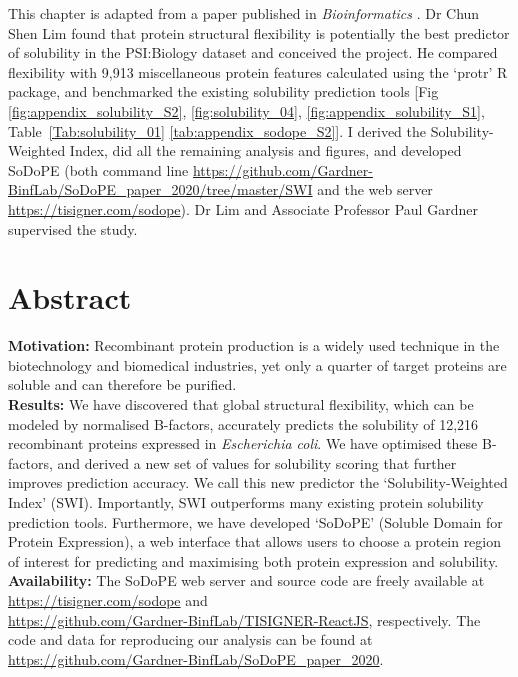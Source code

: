 This chapter is adapted from a paper published in \textit{Bioinformatics} \cite{Bhandari2020-pz}. Dr Chun Shen Lim found that protein structural flexibility is potentially the best predictor of solubility in the PSI:Biology dataset and conceived the project. He compared flexibility with 9,913 miscellaneous protein features calculated using the ‘protr’ R package, and benchmarked the existing solubility prediction tools [Fig \ref{fig:appendix_solubility_S2}, \ref{fig:solubility_04},  \ref{fig:appendix_solubility_S1}, Table~\ref{Tab:solubility_01} \ref{tab:appendix_sodope_S2}]. I derived the Solubility-Weighted Index,  did all the remaining analysis and figures, and developed SoDoPE (both command line \href{https://github.com/Gardner-BinfLab/SoDoPE\_paper\_2020/tree/master/SWI}{https://github.com/Gardner-BinfLab/SoDoPE\_paper\_2020/tree/master/SWI} and the web server \href{https://tisigner.com/sodope}{https://tisigner.com/sodope}). Dr Lim and Associate Professor Paul Gardner supervised the study.


\section{Abstract}
\textbf{Motivation:} Recombinant protein production is a widely used technique in the biotechnology and biomedical industries, yet only a quarter of target proteins are soluble and can therefore be purified.\\
\textbf{Results:} We have discovered that global structural flexibility, which can be modeled by normalised B-factors, accurately predicts the solubility of 12,216 recombinant proteins expressed in \textit{Escherichia coli}. We have optimised these B-factors, and derived a new set of values for solubility scoring that further improves prediction accuracy. We call this new predictor the ‘Solubility-Weighted Index’ (SWI). Importantly, SWI outperforms many existing protein solubility prediction tools. Furthermore, we have developed ‘SoDoPE’ (Soluble Domain for Protein Expression), a web interface that allows users to choose a protein region of interest for predicting and maximising both protein expression and solubility.\\
\textbf{Availability:} The SoDoPE web server and source code are freely available at\\ \href{https://tisigner.com/sodope}{https://tisigner.com/sodope} and \\ \href{https://github.com/Gardner-BinfLab/TISIGNER-ReactJS}{https://github.com/Gardner-BinfLab/TISIGNER-ReactJS}, respectively.
The code and data for reproducing our analysis can be found at\\ \href{https://github.com/Gardner-BinfLab/SoDoPE\_paper\_2020}{https://github.com/Gardner-BinfLab/SoDoPE\_paper\_2020}.\\


